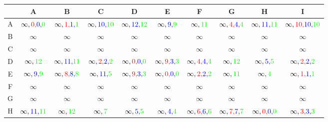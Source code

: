 \documentclass[a4paper,10pt]{article}
\begin{document}
\begin{table}[H]
\centering
\begin{tabular}{|c|c|c|c|c|c|c|c|c|c|} \hline
 & A & B & C & D & E & F & G & H & I  \\\hline
A & $ \infty,{\color{red}0,}{\color{blue}0,}{\color{green}0} $ & $ \infty,{\color{red}1,}{\color{blue}1,}{\color{green}1}$ & $ \infty,{\color{blue}10,}{\color{green}10}$ & $ \infty,{\color{blue}12,}{\color{green}12}$ & $ \infty,{\color{blue}9,}{\color{green}9}$ & $ \infty,{\color{green}11}$ & $ \infty,{\color{red}4,}{\color{blue}4,}{\color{green}4}$ & $ \infty,{\color{blue}11,}{\color{green}11}$ & $ \infty,{\color{red}10,}{\color{blue}10,}{\color{green}10}$ \\\hline
B & $ \infty$ & $ \infty$ & $ \infty$ & $ \infty$ & $ \infty$ & $ \infty$ & $ \infty$ & $ \infty$ & $ \infty$ \\\hline
C & $ \infty$ & $ \infty$ & $ \infty$ & $ \infty$ & $ \infty$ & $ \infty$ & $ \infty$ & $ \infty$ & $ \infty$ \\\hline
D & $ \infty,{\color{green}12}$ & $ \infty,{\color{blue}11,}{\color{green}11}$ & $ \infty,{\color{red}2,}{\color{blue}2,}{\color{green}2}$ & $ \infty,{\color{red}0,}{\color{blue}0,}{\color{green}0}$ & $ \infty,{\color{red}9,}{\color{blue}3,}{\color{green}3}$ & $ \infty,{\color{red}4,}{\color{blue}4,}{\color{green}4}$ & $ \infty,{\color{green}12}$ & $ \infty,{\color{blue}5,}{\color{green}5}$ & $ \infty,{\color{red}2,}{\color{blue}2,}{\color{green}2}$ \\\hline
E & $ \infty,{\color{blue}9,}{\color{green}9}$ & $ \infty,{\color{red}8,}{\color{blue}8,}{\color{green}8}$ & $ \infty,{\color{blue}11,}{\color{green}5}$ & $ \infty,{\color{red}9,}{\color{blue}3,}{\color{green}3}$ & $ \infty,{\color{red}0,}{\color{blue}0,}{\color{green}0}$ & $ \infty,{\color{red}2,}{\color{blue}2,}{\color{green}2}$ & $ \infty,{\color{green}11}$ & $ \infty,{\color{green}4}$ & $ \infty,{\color{red}1,}{\color{blue}1,}{\color{green}1}$ \\\hline
F & $ \infty$ & $ \infty$ & $ \infty$ & $ \infty$ & $ \infty$ & $ \infty$ & $ \infty$ & $ \infty$ & $ \infty$ \\\hline
G & $ \infty$ & $ \infty$ & $ \infty$ & $ \infty$ & $ \infty$ & $ \infty$ & $ \infty$ & $ \infty$ & $ \infty$ \\\hline
H & $ \infty,{\color{blue}11,}{\color{green}11}$ & $ \infty,{\color{green}12}$ & $ \infty,{\color{green}7}$ & $ \infty,{\color{blue}5,}{\color{green}5}$ & $ \infty,{\color{blue}4,}{\color{green}4}$ & $ \infty,{\color{red}6,}{\color{blue}6,}{\color{green}6}$ & $ \infty,{\color{red}7,}{\color{blue}7,}{\color{green}7}$ & $ \infty,{\color{red}0,}{\color{blue}0,}{\color{green}0}$ & $ \infty,{\color{red}3,}{\color{blue}3,}{\color{green}3}$ \\\hline

\end{tabular}
\end{table}
\end{document}
